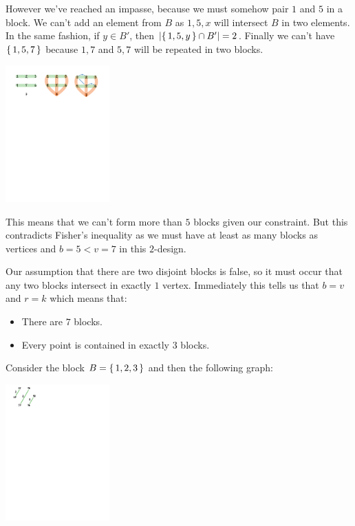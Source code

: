 \documentclass[12pt]{memoir}
\begin{document}
\begin{ptcbr}
\begin{itemize}
\begin{center}
        \end{center}
        However we've reached an impasse, because we must somehow pair $1$ and $5$ in a block. We can't add an element from $B$ as ${1,5,x}$ will intersect $B$ in two elements. In the same fashion, if $y\in B'$, then $|\{\,1,5,y\,\}\cap B'|=2$. Finally we can't have $\{\,1,5,7\,\}$ because $1,7$ and $5,7$ will be repeated in two blocks. 
        \begin{center}
            \includegraphics[width=0.3\textwidth, trim= 14.1cm 21.8cm 2cm 1.8cm,clip]{fig1.pdf}
        \end{center}
        This means that we can't form more than $5$ blocks given our constraint. But this contradicts Fisher's inequality as we must have at least as many blocks as vertices and $b=5<v=7$ in this $2$-design.
    \end{itemize}
    Our assumption that there are two disjoint blocks is false, so it must occur that any two blocks intersect in exactly $1$ vertex. Immediately this tells us that $b=v$ and $r=k$ which means that:
    \begin{itemize}
        \itemsep=-0.4em
        \item There are $7$ blocks.
        \item Every point is contained in exactly $3$ blocks.
    \end{itemize}
    Consider the block $B=\{\,1,2,3\,\}$ and then the following graph:
    \begin{center}
        \includegraphics[width=0.3\textwidth, trim= 1.5cm 23.5cm 15cm 0.2cm,clip]{fig2.pdf}

\end{center}
\end{ptcbr}
\end{document}
